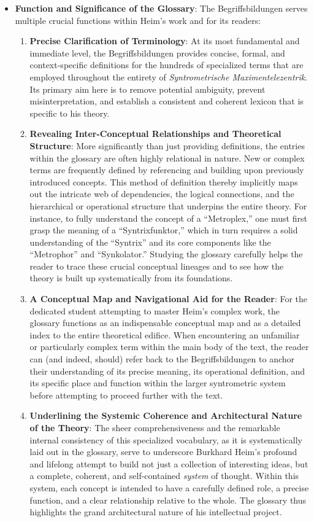 \documentclass[12pt]{article}
\newcommand{\q}[1]{\enquote{#1}}
\begin{document}
\begin{itemize}
    \item \textbf{Function and Significance of the Glossary}:
    The Begriffsbildungen serves multiple crucial functions within Heim's work and for its readers:
    \begin{enumerate}
        \item \textbf{Precise Clarification of Terminology}: At its most fundamental and immediate level, the Begriffsbildungen provides concise, formal, and context-specific definitions for the hundreds of specialized terms that are employed throughout the entirety of \textit{Syntrometrische Maximentelezentrik}. Its primary aim here is to remove potential ambiguity, prevent misinterpretation, and establish a consistent and coherent lexicon that is specific to his theory.
        \item \textbf{Revealing Inter-Conceptual Relationships and Theoretical Structure}: More significantly than just providing definitions, the entries within the glossary are often highly relational in nature. New or complex terms are frequently defined by referencing and building upon previously introduced concepts. This method of definition thereby implicitly maps out the intricate web of dependencies, the logical connections, and the hierarchical or operational structure that underpins the entire theory. For instance, to fully understand the concept of a \q{Metroplex,} one must first grasp the meaning of a \q{Syntrixfunktor,} which in turn requires a solid understanding of the \q{Syntrix} and its core components like the \q{Metrophor} and \q{Synkolator.} Studying the glossary carefully helps the reader to trace these crucial conceptual lineages and to see how the theory is built up systematically from its foundations.
        \item \textbf{A Conceptual Map and Navigational Aid for the Reader}: For the dedicated student attempting to master Heim's complex work, the glossary functions as an indispensable conceptual map and as a detailed index to the entire theoretical edifice. When encountering an unfamiliar or particularly complex term within the main body of the text, the reader can (and indeed, should) refer back to the Begriffsbildungen to anchor their understanding of its precise meaning, its operational definition, and its specific place and function within the larger syntrometric system before attempting to proceed further with the text.
        \item \textbf{Underlining the Systemic Coherence and Architectural Nature of the Theory}: The sheer comprehensiveness and the remarkable internal consistency of this specialized vocabulary, as it is systematically laid out in the glossary, serve to underscore Burkhard Heim's profound and lifelong attempt to build not just a collection of interesting ideas, but a complete, coherent, and self-contained \textit{system} of thought. Within this system, each concept is intended to have a carefully defined role, a precise function, and a clear relationship relative to the whole. The glossary thus highlights the grand architectural nature of his intellectual project.
    \end{enumerate}


\end{itemize}
\end{document}
